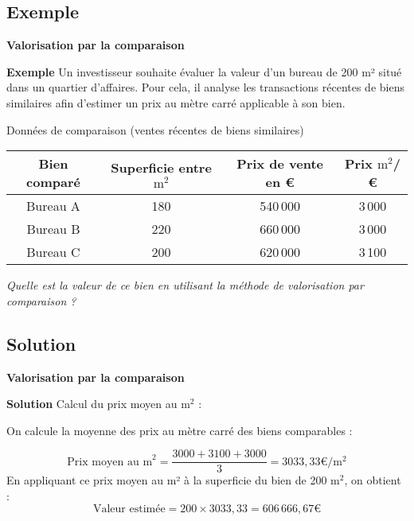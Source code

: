 \documentclass{beamer}
\begin{document}
\subsection{Exemple}
\begin{frame}{\textbf{Valorisation par la comparaison}}
\begin{exampleblock}{\textbf{Exemple}}
Un investisseur souhaite évaluer la valeur d'un bureau de 200 m² situé dans un quartier d'affaires. Pour cela, il analyse les transactions récentes de biens similaires afin d'estimer un prix au mètre carré applicable à son bien.

\begin{center}
	Données de comparaison (ventes récentes de biens similaires)
\end{center}

\begin{center}
	\begin{tabular}{@{}cccc@{}}
	\toprule
	Bien comparé & Superficie entre \( \text{m}^2 \) & Prix de vente en € & Prix  \( \text{m}^2 \)/€ \\ \midrule
	Bureau A     & 180                          & 540\,000               & 3\,000                       \\
	Bureau B     & 220                          & 660\,000               & 3\,000                       \\
	Bureau C     & 200                          & 620\,000               & 3\,100                       \\ \bottomrule

\end{tabular}
\end{center}
\textit{Quelle est la valeur de ce bien en utilisant la méthode de valorisation par comparaison ?}
\end{exampleblock}	

\end{frame}

\subsection{Solution}
\begin{frame}{\textbf{Valorisation par la comparaison}}
	\begin{exampleblock}{\textbf{Solution}}
Calcul du prix moyen au \( \text{m}^2 \) :

On calcule la moyenne des prix au mètre carré des biens comparables :

\[ \text{Prix moyen au m}^2=\frac{3000+3100+3000}{3}=3033,33\text{€}/\text{m}^2\]
En appliquant ce prix moyen au m² à la superficie du bien de 200 \( \text{m}^2 \), on obtient :
\[ \text{Valeur estimée}=200\times3033,33=606\,666,67\text{€} \]
	\end{exampleblock}	
\end{frame}
\end{document}
